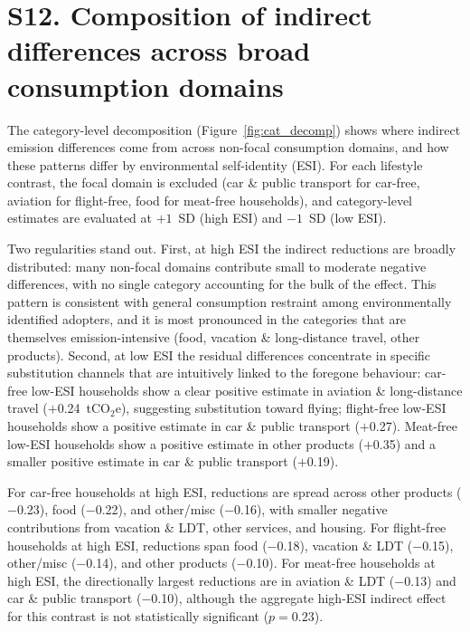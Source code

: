 \documentclass[12pt]{article}
\begin{document}
\section*{S12. Composition of indirect differences across broad consumption domains}

The category-level decomposition (Figure~\ref{fig:cat_decomp}) shows where indirect emission differences come from across non-focal consumption domains, and how these patterns differ by environmental self-identity (ESI). For each lifestyle contrast, the focal domain is excluded (car \& public transport for car-free, aviation for flight-free, food for meat-free households), and category-level estimates are evaluated at $+1$~SD (high ESI) and $-1$~SD (low ESI).

Two regularities stand out. First, at high ESI the indirect reductions are broadly distributed: many non-focal domains contribute small to moderate negative differences, with no single category accounting for the bulk of the effect. This pattern is consistent with general consumption restraint among environmentally identified adopters, and it is most pronounced in the categories that are themselves emission-intensive (food, vacation \& long-distance travel, other products). Second, at low ESI the residual differences concentrate in specific substitution channels that are intuitively linked to the foregone behaviour: car-free low-ESI households show a clear positive estimate in aviation \& long-distance travel ($+$0.24~tCO$_2$e), suggesting substitution toward flying; flight-free low-ESI households show a positive estimate in car \& public transport ($+$0.27). Meat-free low-ESI households show a positive estimate in other products ($+$0.35) and a smaller positive estimate in car \& public transport ($+$0.19).

For car-free households at high ESI, reductions are spread across other products ($-$0.23), food ($-$0.22), and other/misc ($-$0.16), with smaller negative contributions from vacation \& LDT, other services, and housing. For flight-free households at high ESI, reductions span food ($-$0.18), vacation \& LDT ($-$0.15), other/misc ($-$0.14), and other products ($-$0.10). For meat-free households at high ESI, the directionally largest reductions are in aviation \& LDT ($-$0.13) and car \& public transport ($-$0.10), although the aggregate high-ESI indirect effect for this contrast is not statistically significant ($p=0.23$). 
\end{document}
